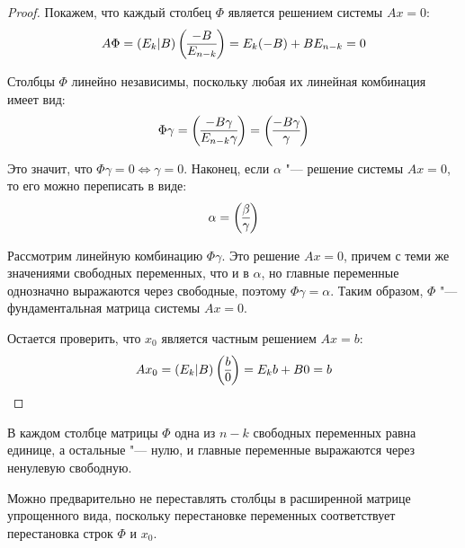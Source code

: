 \begin{proof}
	Покажем, что каждый столбец $\Phi$ является решением системы $Ax = 0$:
	\[A\Phi = (E_k|B)\left(\begin{array}{@{}c@{}}-B\\\hline E_{n-k}\end{array}\right) = E_k(-B) + BE_{n-k} = 0\]
	
	Столбцы $\Phi$ линейно независимы, поскольку любая их линейная комбинация имеет вид:
	\[\Phi\gamma = \left(\begin{array}{@{}c@{}}-B\gamma\\\hline E_{n - k}\gamma\end{array}\right) = \left(\begin{array}{@{}c@{}}-B\gamma\\\hline \gamma\end{array}\right)\]
	
	Это значит, что $\Phi\gamma = 0 \Leftrightarrow \gamma = 0$. Наконец, если $\alpha$ "--- решение системы $Ax = 0$, то его можно переписать в виде:
	\[\alpha = \left(\begin{array}{@{}c@{}}\beta\\\hline \gamma\end{array}\right)\]
	
	Рассмотрим линейную комбинацию $\Phi\gamma$. Это решение $Ax = 0$, причем с теми же значениями свободных переменных, что и в $\alpha$, но главные переменные однозначно выражаются через свободные, поэтому $\Phi\gamma = \alpha$. Таким образом, $\Phi$ "--- фундаментальная матрица системы $Ax = 0$.
	
	Остается проверить, что $x_0$ является частным решением $Ax = b$:
	\[Ax_0 = (E_k|B)\left(\begin{array}{@{}c@{}}b\\\hline 0\end{array}\right) = E_kb + B0 = b\]
\end{proof}

\begin{note}
	В каждом столбце матрицы $\Phi$ одна из $n - k$ свободных переменных равна единице, а остальные "--- нулю, и главные переменные выражаются через ненулевую свободную.
\end{note}

\begin{note}
	Можно предварительно не переставлять столбцы в расширенной матрице упрощенного вида, поскольку перестановке переменных соответствует перестановка строк $\Phi$ и $x_0$.
\end{note}

